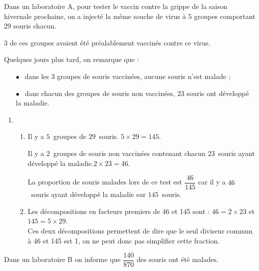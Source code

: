 
\medskip

Dans un laboratoire A, pour tester le vaccin contre la grippe de la saison hivernale prochaine, on a injecté la même souche de virus à  5 groupes comportant 29 souris chacun.

3 de ces groupes avaient été préalablement vaccinés contre ce virus.

Quelques jours plus tard, on remarque que :

\setlength\parindent{10mm}
\begin{itemize}
\item[$\bullet~~$] dans les $3$ groupes de souris vaccinées, aucune souris n'est malade ;
\item[$\bullet~~$] dans chacun des groupes de souris non vaccinées, $23$ souris ont développé la maladie.
\end{itemize}
\setlength\parindent{0mm} 

\medskip
 
\begin{enumerate}
\item 
	\begin{enumerate}
		\item Il y a $5$~groupes de $29$~souris. $5\times29=145$.
		
Il y a $2$~groupes de souris non vaccinées contenant chacun $23$~souris ayant développé la maladie.$2\times23=46$.
		
		 La proportion de souris malades lors de ce test est $\dfrac{46}{145}$ car il y a $46$~souris ayant développé la maladie sur $145$~souris.
		\item Les décompositions en facteurs premiers de 46 et 145 sont : \quad $46=2\times23$ et $145=5\times29$. \\
		Ces deux décompositions permettent de dire que le seul diviseur commun à 46 et 145 est 1, on ne peut donc pas simplifier cette fraction.
	\end{enumerate}	
\end{enumerate}
		
Dans un laboratoire B on informe que $\dfrac{140}{870}$ des souris ont été malades.

